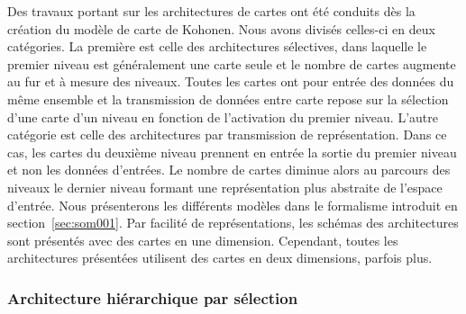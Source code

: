 \documentclass[../main]{subfiles}
\begin{document}
Des travaux portant sur les architectures de cartes ont été conduits dès la création du modèle de carte de Kohonen.
Nous avons divisés celles-ci en deux catégories. 
La première est celle des architectures sélectives, dans laquelle le premier niveau est généralement une carte seule et le nombre de cartes augmente au fur et à mesure des niveaux. Toutes les cartes ont pour entrée des données du même ensemble et la transmission de données entre carte repose sur la sélection d'une carte d'un niveau en fonction de l'activation du premier niveau. 
L'autre catégorie est celle des architectures par transmission de représentation. Dans ce cas, les cartes du deuxième niveau prennent en entrée la sortie du premier niveau et non les données d'entrées. Le nombre de cartes diminue alors au parcours des niveaux le dernier niveau formant une représentation plus abstraite de l'espace d'entrée.
Nous présenterons les différents modèles dans le formalisme introduit en section~\ref{sec:som001}. Par facilité de représentations, les schémas des architectures sont présentés avec des cartes en une dimension. Cependant, toutes les architectures présentées utilisent des cartes en deux dimensions, parfois plus.
\subsubsection{Architecture hiérarchique par sélection}
\end{document}
